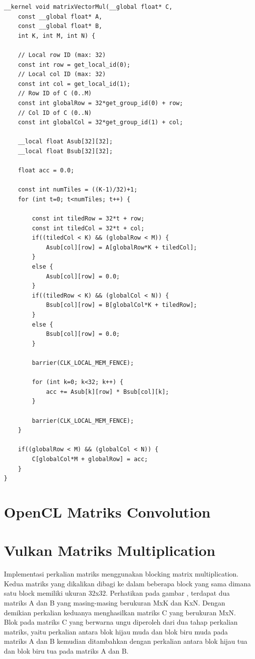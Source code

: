 \begin{lstlisting}[frame=single]
__kernel void matrixVectorMul(__global float* C, 
    const __global float* A, 
    const __global float* B, 
    int K, int M, int N) { 

	// Local row ID (max: 32)
    const int row = get_local_id(0);
    // Local col ID (max: 32)  
    const int col = get_local_id(1);
    // Row ID of C (0..M)  
    const int globalRow = 32*get_group_id(0) + row; 
    // Col ID of C (0..N) 
    const int globalCol = 32*get_group_id(1) + col;  

    __local float Asub[32][32]; 
    __local float Bsub[32][32]; 

    float acc = 0.0; 

    const int numTiles = ((K-1)/32)+1; 
    for (int t=0; t<numTiles; t++) { 

        const int tiledRow = 32*t + row; 
        const int tiledCol = 32*t + col; 
        if((tiledCol < K) && (globalRow < M)) {
            Asub[col][row] = A[globalRow*K + tiledCol]; 
        }  
        else {   
            Asub[col][row] = 0.0; 
        }  
        if((tiledRow < K) && (globalCol < N)) {
            Bsub[col][row] = B[globalCol*K + tiledRow]; 
        }  
        else {   
            Bsub[col][row] = 0.0; 
        }  

        barrier(CLK_LOCAL_MEM_FENCE); 

        for (int k=0; k<32; k++) { 
            acc += Asub[k][row] * Bsub[col][k]; 
        } 

        barrier(CLK_LOCAL_MEM_FENCE); 
    } 

    if((globalRow < M) && (globalCol < N)) { 
        C[globalCol*M + globalRow] = acc; 
    }
}
\end{lstlisting}

\section{OpenCL Matriks Convolution}

\section{Vulkan Matriks Multiplication}
Implementasi perkalian matriks menggunakan blocking matrix multiplication. Kedua matriks yang dikalikan dibagi ke dalam beberapa block yang sama dimana satu block memiliki ukuran 32x32. Perhatikan pada gambar , terdapat dua matriks A dan B yang masing-masing berukuran MxK dan KxN. Dengan demikian perkalian keduanya menghasilkan matriks C yang berukuran MxN. Blok pada matriks C yang berwarna ungu diperoleh dari dua tahap perkalian matriks, yaitu perkalian antara blok hijau muda dan blok biru muda pada matriks A dan B kemudian ditambahkan dengan perkalian antara blok hijau tua dan blok biru tua pada matriks A dan B.

